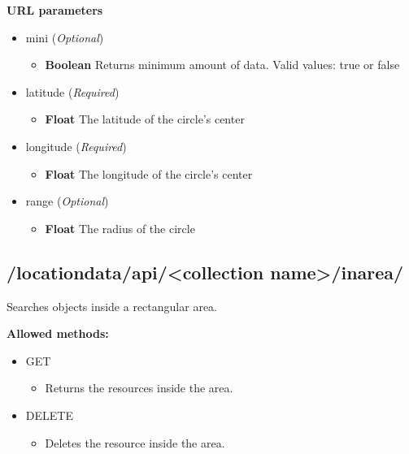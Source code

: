 \documentclass[letterpaper,10pt,english]{sphinxmanual}
\begin{document}
\textbf{URL parameters}
\begin{itemize}
\item {} 
mini (\emph{Optional})
\begin{itemize}
\item {} 
\textbf{Boolean} Returns minimum amount of data. Valid values: true or false

\end{itemize}

\item {} 
latitude (\emph{Required})
\begin{itemize}
\item {} 
\textbf{Float} The latitude of the circle's center

\end{itemize}

\item {} 
longitude (\emph{Required})
\begin{itemize}
\item {} 
\textbf{Float} The longitude of the circle's center

\end{itemize}

\item {} 
range (\emph{Optional})
\begin{itemize}
\item {} 
\textbf{Float} The radius of the circle

\end{itemize}

\end{itemize}


\subsection{/locationdata/api/\textless{}collection name\textgreater{}/inarea/}
\label{restdoc:locationdata-api-collection-name-inarea}
Searches objects inside a rectangular area.

\textbf{Allowed methods:}
\begin{itemize}
\item {} 
GET
\begin{itemize}
\item {} 
Returns the resources inside the area.

\end{itemize}

\item {} 
DELETE
\begin{itemize}
\item {} 
Deletes the resource inside the area.

\end{itemize}

\end{itemize}
\end{document}

